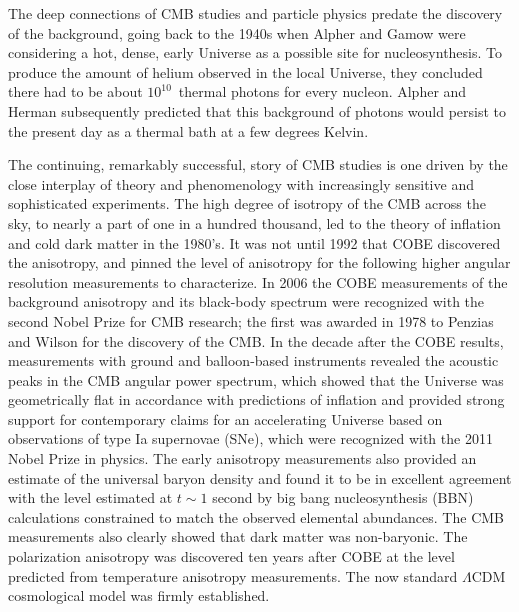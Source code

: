 The deep connections of CMB studies and particle physics predate the discovery of the background, going back to the 1940s when Alpher and Gamow were considering a hot, dense, early Universe as a possible site for nucleosynthesis. To produce the
amount of helium observed in the local Universe, they concluded there
had to be about $10^{10}$\ thermal photons for every nucleon. Alpher and Herman subsequently predicted that this background of photons would persist to the present day as a thermal bath at a few degrees Kelvin.

The continuing, remarkably successful, story of CMB studies is one driven by the close interplay of theory and phenomenology with increasingly sensitive and sophisticated experiments. The high degree of isotropy of the CMB across the sky, to nearly a part of one in a hundred thousand, led to the theory of inflation and cold dark matter in the 1980's. It was not until 1992 that COBE discovered the anisotropy, and pinned the level of anisotropy for the following higher angular resolution measurements to characterize. In 2006 the COBE measurements of the background anisotropy and its black-body spectrum were recognized with the second Nobel Prize for CMB research; the first was awarded in 1978 to Penzias and Wilson for the discovery of the CMB.  In the decade after the COBE results, measurements with ground and balloon-based instruments revealed the acoustic peaks in the CMB angular power spectrum, which showed that the Universe was geometrically flat in accordance with predictions of inflation and provided strong support for contemporary claims for an accelerating Universe based on observations of type Ia supernovae (SNe), which were recognized with the 2011 Nobel Prize in physics. The early anisotropy measurements also provided an estimate of the universal baryon density and found it to be in excellent agreement with the level estimated at $t \sim 1$ second by big bang nucleosynthesis (BBN) calculations constrained to match the observed elemental abundances. The CMB measurements also clearly showed that dark matter was non-baryonic. The polarization anisotropy was discovered ten years after COBE at the level predicted from temperature anisotropy measurements. The now standard $\Lambda$CDM cosmological model was firmly established.

